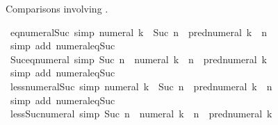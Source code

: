 \begin{isabellebody}
\begin{isamarkuptext}%
Comparisons involving .%
\end{isamarkuptext}\isamarkuptrue%
\isamarkupfalse%
\ eq{\isacharunderscore}{\kern0pt}numeral{\isacharunderscore}{\kern0pt}Suc\ {\isacharbrackleft}{\kern0pt}simp{\isacharbrackright}{\kern0pt}{\isacharcolon}{\kern0pt}\ {\isachardoublequoteopen}numeral\ k\ {\isacharequal}{\kern0pt}\ Suc\ n\ {\isasymlongleftrightarrow}\ pred{\isacharunderscore}{\kern0pt}numeral\ k\ {\isacharequal}{\kern0pt}\ n{\isachardoublequoteclose}\isanewline
%
\isadelimproof
\ \ %
\endisadelimproof
%
\isatagproof
{}\isamarkupfalse%
\ {\isacharparenleft}{\kern0pt}simp\ add{\isacharcolon}{\kern0pt}\ numeral{\isacharunderscore}{\kern0pt}eq{\isacharunderscore}{\kern0pt}Suc{\isacharparenright}{\kern0pt}%
\endisatagproof
{\isafoldproof}%
%
\isadelimproof
\isanewline
%
\endisadelimproof
\isanewline
{}\isamarkupfalse%
\ Suc{\isacharunderscore}{\kern0pt}eq{\isacharunderscore}{\kern0pt}numeral\ {\isacharbrackleft}{\kern0pt}simp{\isacharbrackright}{\kern0pt}{\isacharcolon}{\kern0pt}\ {\isachardoublequoteopen}Suc\ n\ {\isacharequal}{\kern0pt}\ numeral\ k\ {\isasymlongleftrightarrow}\ n\ {\isacharequal}{\kern0pt}\ pred{\isacharunderscore}{\kern0pt}numeral\ k{\isachardoublequoteclose}\isanewline
%
\isadelimproof
\ \ %
\endisadelimproof
%
\isatagproof
{}\isamarkupfalse%
\ {\isacharparenleft}{\kern0pt}simp\ add{\isacharcolon}{\kern0pt}\ numeral{\isacharunderscore}{\kern0pt}eq{\isacharunderscore}{\kern0pt}Suc{\isacharparenright}{\kern0pt}%
\endisatagproof
{\isafoldproof}%
%
\isadelimproof
\isanewline
%
\endisadelimproof
\isanewline
{}\isamarkupfalse%
\ less{\isacharunderscore}{\kern0pt}numeral{\isacharunderscore}{\kern0pt}Suc\ {\isacharbrackleft}{\kern0pt}simp{\isacharbrackright}{\kern0pt}{\isacharcolon}{\kern0pt}\ {\isachardoublequoteopen}numeral\ k\ {\isacharless}{\kern0pt}\ Suc\ n\ {\isasymlongleftrightarrow}\ pred{\isacharunderscore}{\kern0pt}numeral\ k\ {\isacharless}{\kern0pt}\ n{\isachardoublequoteclose}\isanewline
%
\isadelimproof
\ \ %
\endisadelimproof
%
\isatagproof
{}\isamarkupfalse%
\ {\isacharparenleft}{\kern0pt}simp\ add{\isacharcolon}{\kern0pt}\ numeral{\isacharunderscore}{\kern0pt}eq{\isacharunderscore}{\kern0pt}Suc{\isacharparenright}{\kern0pt}%
\endisatagproof
{\isafoldproof}%
%
\isadelimproof
\isanewline
%
\endisadelimproof
\isanewline
{}\isamarkupfalse%
\ less{\isacharunderscore}{\kern0pt}Suc{\isacharunderscore}{\kern0pt}numeral\ {\isacharbrackleft}{\kern0pt}simp{\isacharbrackright}{\kern0pt}{\isacharcolon}{\kern0pt}\ {\isachardoublequoteopen}Suc\ n\ {\isacharless}{\kern0pt}\ numeral\ k\ {\isasymlongleftrightarrow}\ n\ {\isacharless}{\kern0pt}\ pred{\isacharunderscore}{\kern0pt}numeral\ k{\isachardoublequoteclose}\isanewline

\end{isabellebody}
